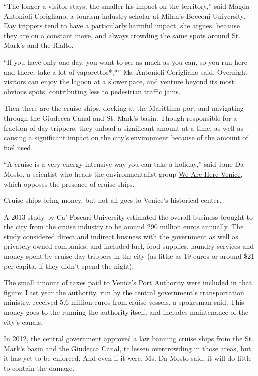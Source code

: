 ``The longer a visitor stays, the smaller his impact on the territory,''
said Magda Antonioli Corigliano, a tourism industry scholar at Milan's
Bocconi University. Day trippers tend to have a particularly harmful
impact, she argues, because they are on a constant move, and always
crowding the same spots around St. Mark's and the Rialto.

``If you have only one day, you want to see as much as you can, so you
run here and there, take a lot of vaporettos*,*'' Ms. Antonioli
Corigliano said. Overnight visitors can enjoy the lagoon at a slower
pace, and venture beyond its most obvious spots, contributing less to
pedestrian traffic jams.

Then there are the cruise ships, docking at the Marittima port and
navigating through the Giudecca Canal and St. Mark's basin. Though
responsible for a fraction of day trippers, they unload a significant
amount at a time, as well as causing a significant impact on the city's
environment because of the amount of fuel used.

``A cruise is a very energy-intensive way you can take a holiday,'' said
Jane Da Mosto, a scientist who heads the environmentalist group
\href{https://weareherevenice.org/}{We Are Here Venice}, which opposes
the presence of cruise ships.

Cruise ships bring money, but not all goes to Venice's historical
center.

A 2013 study by Ca' Foscari University estimated the overall business
brought to the city from the cruise industry to be around 290 million
euros annually. The study considered direct and indirect business with
the government as well as privately owned companies, and included fuel,
food supplies, laundry services and money spent by cruise day-trippers
in the city (as little as 19 euros or around \$21 per capita, if they
didn't spend the night).

The small amount of taxes paid to Venice's Port Authority were included
in that figure: Last year the authority, run by the central government's
transportation ministry, received 5.6 million euros from cruise vessels,
a spokesman said. This money goes to the running the authority itself,
and includes maintenance of the city's canals.

In 2012, the central government approved a law banning cruise ships from
the St. Mark's basin and the Giudecca Canal, to lessen overcrowding in
those areas, but it has yet to be enforced. And even if it were, Ms. Da
Mosto said, it will do little to contain the damage.

